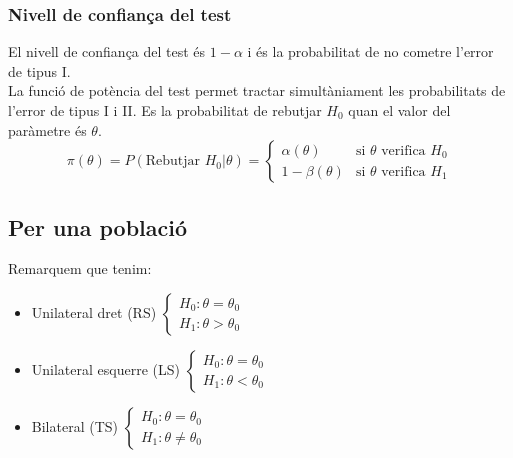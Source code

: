 \documentclass[a4paper]{sciposter}
\begin{document}
\begin{multicols}{3}
\subsubsection{Nivell de confiança del test}
El nivell de confiança del test és $1-\alpha$ i és la probabilitat de no cometre l'error de tipus I.\\
La funció de potència del test permet tractar simultàniament les probabilitats de l'error de tipus I i II. Es la probabilitat de rebutjar $H_0$ quan el valor del paràmetre és $\theta$.\\
\begin{displaymath}
	\pi(\theta) = P(\text{Rebutjar } H_0 | \theta) = \begin{cases} \alpha(\theta) & \text{si } \theta \text{ verifica } H_0\\ 1-\beta(\theta) & \text{si } \theta \text{ verifica } H_1
	\end{cases}
\end{displaymath}
\subsection{Per una població}
Remarquem que tenim:
\begin{itemize}
	\item Unilateral dret (RS) $\begin{cases} H_0: \theta = \theta_0\\ H_1: \theta > \theta_0\end{cases}$
	\item Unilateral esquerre (LS) $\begin{cases} H_0: \theta = \theta_0\\ H_1: \theta < \theta_0\end{cases}$
	\item Bilateral (TS) $\begin{cases} H_0: \theta = \theta_0\\ H_1: \theta \neq \theta_0\end{cases}$
\end{itemize}

\end{multicols}
\end{document}
